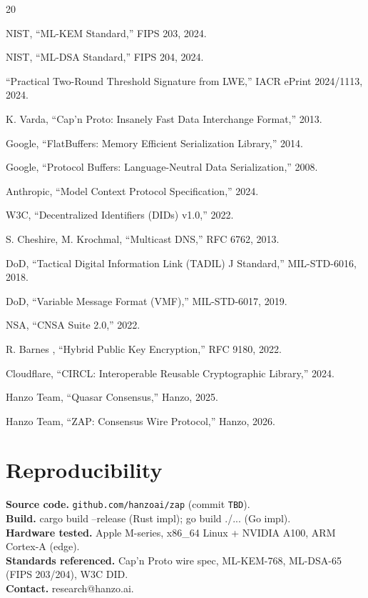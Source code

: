 \documentclass[11pt,letterpaper]{article}
\begin{document}
\begin{thebibliography}{20}

 NIST, ``ML-KEM Standard,'' FIPS 203, 2024.

 NIST, ``ML-DSA Standard,'' FIPS 204, 2024.

 ``Practical Two-Round Threshold Signature from LWE,'' IACR ePrint 2024/1113, 2024.

 K. Varda, ``Cap'n Proto: Insanely Fast Data Interchange Format,'' 2013.

 Google, ``FlatBuffers: Memory Efficient Serialization Library,'' 2014.

 Google, ``Protocol Buffers: Language-Neutral Data Serialization,'' 2008.

 Anthropic, ``Model Context Protocol Specification,'' 2024.

 W3C, ``Decentralized Identifiers (DIDs) v1.0,'' 2022.

 S. Cheshire, M. Krochmal, ``Multicast DNS,'' RFC 6762, 2013.

 DoD, ``Tactical Digital Information Link (TADIL) J Standard,'' MIL-STD-6016, 2018.

 DoD, ``Variable Message Format (VMF),'' MIL-STD-6017, 2019.

 NSA, ``CNSA Suite 2.0,'' 2022.

 R. Barnes \etal, ``Hybrid Public Key Encryption,'' RFC 9180, 2022.

 Cloudflare, ``CIRCL: Interoperable Reusable Cryptographic Library,'' 2024.

 Hanzo Team, ``Quasar Consensus,'' Hanzo, 2025.

 Hanzo Team, ``ZAP: Consensus Wire Protocol,'' Hanzo, 2026.

\end{thebibliography}

\section*{Reproducibility}
\textbf{Source code.} \texttt{github.com/hanzoai/zap} (commit \texttt{TBD}).\\
\textbf{Build.} cargo build --release (Rust impl); go build ./... (Go impl).\\
\textbf{Hardware tested.} Apple M-series, x86\_64 Linux + NVIDIA A100, ARM Cortex-A (edge).\\
\textbf{Standards referenced.} Cap'n Proto wire spec, ML-KEM-768, ML-DSA-65 (FIPS 203/204), W3C DID.\\
\textbf{Contact.} research@hanzo.ai.
\end{document}
